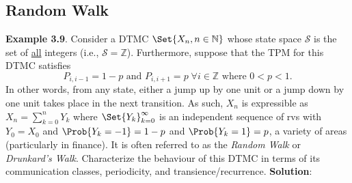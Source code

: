 \subsection*{Random Walk}
\begin{Example}
    \textbf{Example 3.9}. Consider a DTMC $ \Set{X_n,n\in\mathbb{N}} $ whose state space $ \mathcal{S} $
    is the set of \underline{all} integers (i.e., $ \mathcal{S}=\mathbb{Z} $). Furthermore, suppose
    that the TPM for this DTMC satisfies
    \[ P_{i,i-1}=1-p\text{ and }P_{i,i+1}=p\;\forall i\in\mathbb{Z}\text{ where }0<p<1. \]
    In other words, from any state, either a jump up by one unit or a jump down by one unit takes
    place in the next transition. As such, $ X_n $ is expressible as $ X_n=\sum_{k=0}^{n} Y_k $ where $ \Set{Y_k}_{k=0}^\infty $
    is an independent sequence of rvs with $ Y_0=X_0 $ and $ \Prob{Y_k=-1}=1-p $ and $ \Prob{Y_k=1}=p $,
    a variety of areas (particularly in finance). It is often referred to as the \emph{Random Walk} or
    \emph{Drunkard's Walk}. Characterize the behaviour of this DTMC in terms of its communication
    classes, periodicity, and transience/recurrence.
    \tcblower{}
    \textbf{Solution}:
\end{Example}
